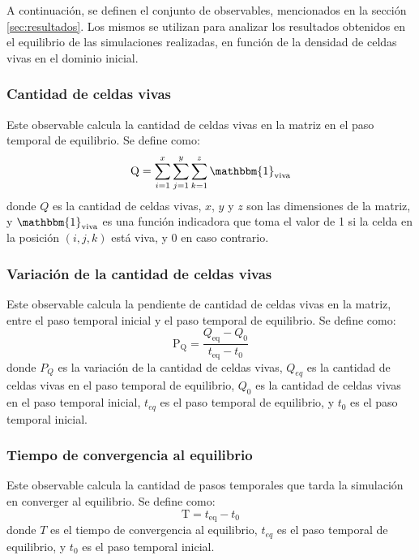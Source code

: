 A continuación, se definen el conjunto de observables, mencionados en la sección \ref{sec:resultados}.
Los mismos se utilizan para analizar los resultados obtenidos en el equilibrio de las simulaciones
realizadas, en función de la densidad de celdas vivas en el dominio inicial.

\subsubsection{Cantidad de celdas vivas}\label{subsubsec:cantidad-de-celdas-vivas}
Este observable calcula la cantidad de celdas vivas en la matriz en el paso temporal de equilibrio.
Se define como:
\begin{equation}
    \text{Q} = \sum_{i=1}^{x} \sum_{j=1}^{y} \sum_{k=1}^{z} \mathbbm{1}_{\text{viva}}
    \label{eq:cantidad-celdas-vivas}
\end{equation}
donde $Q$ es la cantidad de celdas vivas, $x$, $y$ y $z$ son las dimensiones de la matriz, y $\mathbbm{1}_{\text{viva}}$
es una función indicadora que toma el valor de 1 si la celda en la posición $(i, j, k)$ está viva, y 0 en caso contrario.

\subsubsection{Variación de la cantidad de celdas vivas}\label{subsubsec:pendiente-de-crecimiento-de-cantidad-de-celdas-vivas}
Este observable calcula la pendiente de cantidad de celdas vivas en la matriz, entre el paso temporal
inicial y el paso temporal de equilibrio.
Se define como:
\begin{equation}
    \text{P}_{\text{Q}} = \frac{Q_{\text{eq}} - Q_{0}}{t_{\text{eq}} - t_{0}}
    \label{eq:pendiente-crecimiento-celdas-vivas}
\end{equation}
donde $P_{Q}$ es la variación de la cantidad de celdas vivas, $Q_{eq}$ es la
cantidad de celdas vivas en el paso temporal de equilibrio, $Q_{0}$ es la cantidad de celdas
vivas en el paso temporal inicial, $t_{eq}$ es el paso temporal de equilibrio, y $t_{0}$ es el paso temporal inicial.

\subsubsection{Tiempo de convergencia al equilibrio}\label{subsubsec:tiempo-de-convergencia-al-equilibrio}
Este observable calcula la cantidad de pasos temporales que tarda la simulación en converger al equilibrio.
Se define como:
\begin{equation}
    \text{T} = t_{\text{eq}} - t_{0}
    \label{eq:tiempo-convergencia-equilibrio}
\end{equation}
donde $T$ es el tiempo de convergencia al equilibrio, $t_{eq}$ es el paso temporal de equilibrio,
y $t_{0}$ es el paso temporal inicial.


